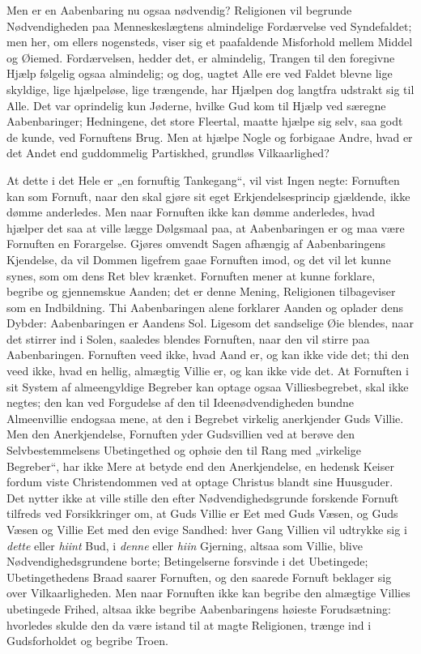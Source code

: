 \documentclass[12pt]{book}
\begin{document}
Men er en Aabenbaring nu ogsaa nødvendig? Religionen vil begrunde
Nødvendigheden paa Menneskeslægtens almindelige Fordærvelse ved
Syndefaldet; men her, om ellers nogensteds, viser sig et
paafaldende Misforhold mellem Middel og Øiemed. Fordærvelsen, hedder
det, er almindelig, Trangen til den foregivne Hjælp følgelig ogsaa
almindelig; og dog, uagtet Alle ere ved Faldet blevne lige skyldige,
lige hjælpeløse, lige trængende, har Hjælpen dog langtfra udstrakt
sig til Alle. Det var oprindelig kun Jøderne, hvilke Gud kom til
Hjælp ved særegne Aabenbaringer; Hedningene, det store Fleertal,
maatte hjælpe sig selv, saa godt de kunde, ved Fornuftens Brug. Men
at hjælpe Nogle og forbigaae Andre, hvad er det Andet end
guddommelig Partiskhed, grundløs Vilkaarlighed?

At dette i det Hele er „en fornuftig Tankegang“, vil vist Ingen
negte: Fornuften kan som Fornuft, naar den skal gjøre sit eget
Erkjendelsesprincip gjældende, ikke dømme anderledes. Men naar
Fornuften ikke kan dømme anderledes, hvad hjælper det saa at ville
lægge Dølgsmaal paa, at Aabenbaringen er og maa være Fornuften en
Forargelse.
Gjøres omvendt Sagen afhængig af Aabenbaringens Kjendelse, da vil
Dommen ligefrem gaae Fornuften imod, og det vil let kunne synes, som
om dens Ret blev krænket. Fornuften mener at kunne forklare, begribe
og gjennemskue Aanden; det er denne Mening, Religionen tilbageviser
som en Indbildning. Thi Aabenbaringen alene forklarer Aanden og
oplader dens Dybder: Aabenbaringen er Aandens Sol. Ligesom det
sandselige Øie blendes, naar det stirrer ind i Solen, saaledes
blendes Fornuften, naar den vil stirre paa Aabenbaringen. Fornuften
veed ikke, hvad Aand er, og kan ikke vide det; thi den veed ikke,
hvad en hellig, almægtig Villie er, og kan ikke vide det. At
Fornuften i sit System af almeengyldige Begreber kan optage ogsaa
Villiesbegrebet, skal ikke negtes; den kan ved Forgudelse af den til
Ideenødvendigheden bundne Almeenvillie endogsaa mene, at den i
Begrebet virkelig anerkjender Guds Villie. Men den Anerkjendelse,
Fornuften yder Gudsvillien ved at berøve den Selvbestemmelsens
Ubetingethed og ophøie den til Rang med „virkelige Begreber“, har
ikke Mere at betyde end den Anerkjendelse, en hedensk Keiser fordum
viste Christendommen ved at optage Christus blandt sine Huusguder.
Det nytter ikke at ville stille den efter Nødvendighedsgrunde
forskende Fornuft tilfreds ved Forsikkringer om, at Guds Villie er
Eet med Guds Væsen, og Guds Væsen og Villie Eet med den evige
Sandhed: hver Gang Villien vil udtrykke sig i \emph{dette} eller
\emph{hiint} Bud, i \emph{denne} eller \emph{hiin} Gjerning, altsaa
som Villie, blive Nødvendighedsgrundene borte; Betingelserne
forsvinde i det Ubetingede; Ubetingethedens Braad saarer Fornuften,
og den saarede Fornuft beklager sig over Vilkaarligheden. Men naar
Fornuften ikke kan begribe den almægtige Villies ubetingede Frihed,
altsaa ikke begribe Aabenbaringens høieste Forudsætning: hvorledes
skulde den da
være istand til at magte Religionen, trænge ind i Gudsforholdet og
begribe Troen.
\end{document}
